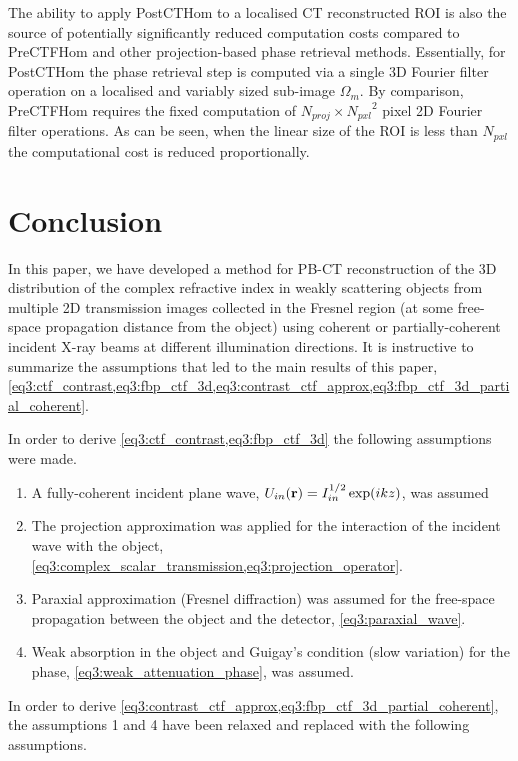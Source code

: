 \documentclass[twocolumn, switch]{article} %
\begin{document}
The ability to apply PostCTHom to a localised CT reconstructed ROI is also the source of potentially significantly reduced computation costs compared to PreCTFHom and other projection-based phase retrieval methods\cite{Thompson2019FastTomography}. Essentially, for PostCTHom the phase retrieval step is computed via a single 3D Fourier filter operation on a localised and variably sized sub-image ${\Omega _m}$. By comparison, PreCTFHom requires the fixed computation of $N_{proj} \times {N_{pxl}}^2$ pixel 2D Fourier filter operations. As can be seen, when the linear size of the ROI is less than $N_{pxl}$ the computational cost is reduced proportionally.

\section{Conclusion}

In this paper, we have developed a method for PB-CT reconstruction of the 3D distribution of the complex refractive index in weakly scattering objects from multiple 2D transmission images collected in the Fresnel region (at some free-space propagation distance from the object) using coherent or partially-coherent incident X-ray beams at different illumination directions. It is instructive to summarize the assumptions that led to the main results of this paper,  \cref{eq3:ctf_contrast,eq3:fbp_ctf_3d,eq3:contrast_ctf_approx,eq3:fbp_ctf_3d_partial_coherent}.

In order to derive \cref{eq3:ctf_contrast,eq3:fbp_ctf_3d} the following assumptions were made.

\begin{enumerate}
    \item A fully-coherent incident plane wave, ${U_{in}}({\bf{r}}) = I_{in}^{1/2}\exp (ikz)$, was assumed
    \item The projection approximation was applied for the interaction of the incident wave with the object, \cref{eq3:complex_scalar_transmission,eq3:projection_operator}.
    \item Paraxial approximation (Fresnel diffraction) was assumed for the free-space propagation between the object and the detector, \cref{eq3:paraxial_wave}.
    \item  Weak absorption in the object and Guigay’s condition (slow variation) for the phase, \cref{eq3:weak_attenuation_phase}, was assumed.
\end{enumerate}

In order to derive \cref{eq3:contrast_ctf_approx,eq3:fbp_ctf_3d_partial_coherent}, the assumptions 1 and 4 have been relaxed and replaced with the following assumptions.
\end{document}
